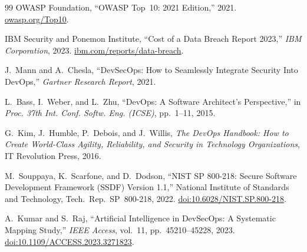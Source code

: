 \documentclass[letterpaper, 10pt, conference]{ieeeconf}
\begin{document}
\begin{thebibliography}{99}
OWASP Foundation,
``{OWASP} Top~10: 2021 Edition,''
2021.
\href{https://owasp.org/Top10}{owasp.org/Top10}.

IBM Security and Ponemon Institute,
``Cost of a Data Breach Report 2023,''
\textit{IBM Corporation}, 2023.
\href{https://www.ibm.com/reports/data-breach}{ibm.com/reports/data-breach}.

J.~Mann and A.~Chesla,
``{DevSecOps}: How to Seamlessly Integrate Security Into {DevOps},''
\textit{Gartner Research Report}, 2021.

L.~Bass, I.~Weber, and L.~Zhu,
``{DevOps}: A Software Architect's Perspective,''
in \textit{Proc. 37th Int. Conf. Softw. Eng. (ICSE)},
pp.~1--11, 2015.

G.~Kim, J.~Humble, P.~Debois, and J.~Willis,
\textit{The {DevOps} Handbook: How to Create World-Class Agility,
Reliability, and Security in Technology Organizations},
IT Revolution Press, 2016.

M.~Souppaya, K.~Scarfone, and D.~Dodson,
``{NIST} {SP} 800-218: Secure Software Development Framework ({SSDF})
Version 1.1,''
National Institute of Standards and Technology,
Tech.\ Rep.\ SP~800-218, 2022.
\href{https://doi.org/10.6028/NIST.SP.800-218}{doi:10.6028/NIST.SP.800-218}.

A.~Kumar and S.~Raj,
``Artificial Intelligence in {DevSecOps}: A Systematic Mapping Study,''
\textit{IEEE Access}, vol.~11, pp.~45210--45228, 2023.
\href{https://doi.org/10.1109/ACCESS.2023.3271823}{doi:10.1109/ACCESS.2023.3271823}.

\end{thebibliography}
\end{document}

